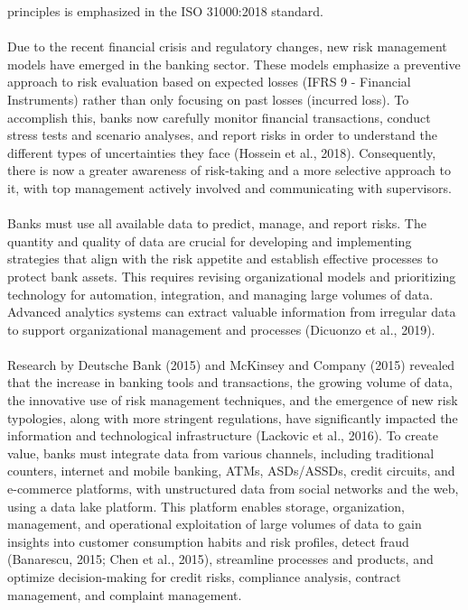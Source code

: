 principles is emphasized in the ISO 31000:2018 standard.\\\\
Due to the recent financial crisis and regulatory changes, new risk management models have emerged in the banking
sector. These models emphasize a preventive approach to risk evaluation based on expected losses 
(IFRS 9 - Financial Instruments) rather than only focusing on past losses (incurred loss). To accomplish this,
banks now carefully monitor financial transactions, conduct stress tests and scenario analyses, and report risks
in order to understand the different types of uncertainties they face (Hossein et al., 2018). Consequently,
there is now a greater awareness of risk-taking and a more selective approach to it, with top management
actively involved and communicating with supervisors.\\\\
Banks must use all available data to predict, manage, and report risks. The quantity and quality of data are
crucial for developing and implementing strategies that align with the risk appetite and establish effective
processes to protect bank assets. This requires revising organizational models and prioritizing technology for
automation, integration, and managing large volumes of data. Advanced analytics systems can extract valuable
information from irregular data to support organizational management and processes (Dicuonzo et al., 2019).\\\\
Research by Deutsche Bank (2015) and McKinsey and Company (2015) revealed that the increase in banking tools and
transactions, the growing volume of data, the innovative use of risk management techniques, and the emergence of
new risk typologies, along with more stringent regulations, have significantly impacted the information and 
technological infrastructure (Lackovic et al., 2016). To create value, banks must integrate data from various
channels, including traditional counters, internet and mobile banking, ATMs, ASDs/ASSDs, credit circuits, and
e-commerce platforms, with unstructured data from social networks and the web, using a data lake platform.
This platform enables storage, organization, management, and operational exploitation of large volumes of data
to gain insights into customer consumption habits and risk profiles, detect fraud
(Banarescu, 2015; Chen et al., 2015), streamline processes and products, and optimize decision-making for
credit risks, compliance analysis, contract management, and complaint management.\\\\
